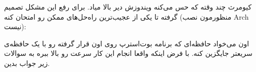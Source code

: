 \question کیومرث چند وقته که حس می‌کنه ویندوزش
دیر بالا میاد. برای رفع این مشکل تصمیم گرفته تا یکی از عجیب‌ترین راه‌حل‌های ممکن
رو امتحان کنه
(منظورمون نصب
Arch
نیست):

اون می‌خواد حافظه‌ای که برنامه بوت‌استرپ روی اون قرار گرفته رو با یک حافظه‌ی سریعتر
جایگزین کنه. با فرض اینکه واقعا انجام این کار سرعت رو بالا ببره به سوالات زیر جواب بدین.
